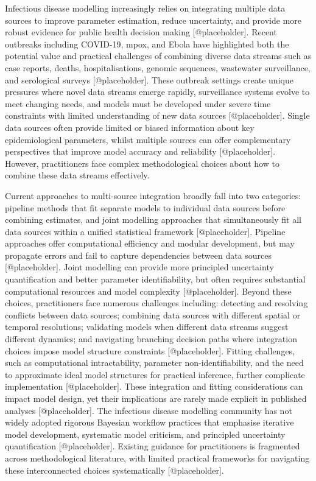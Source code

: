 \documentclass{article}
\begin{document}
Infectious disease modelling increasingly relies on integrating multiple data sources to improve parameter estimation, reduce uncertainty, and provide more robust evidence for public health decision making [@placeholder].
Recent outbreaks including COVID-19, mpox, and Ebola have highlighted both the potential value and practical challenges of combining diverse data streams such as case reports, deaths, hospitalisations, genomic sequences, wastewater surveillance, and serological surveys [@placeholder].
These outbreak settings create unique pressures where novel data streams emerge rapidly, surveillance systems evolve to meet changing needs, and models must be developed under severe time constraints with limited understanding of new data sources [@placeholder].
Single data sources often provide limited or biased information about key epidemiological parameters, whilst multiple sources can offer complementary perspectives that improve model accuracy and reliability [@placeholder].
However, practitioners face complex methodological choices about how to combine these data streams effectively.

Current approaches to multi-source integration broadly fall into two categories: pipeline methods that fit separate models to individual data sources before combining estimates, and joint modelling approaches that simultaneously fit all data sources within a unified statistical framework [@placeholder].
Pipeline approaches offer computational efficiency and modular development, but may propagate errors and fail to capture dependencies between data sources [@placeholder].
Joint modelling can provide more principled uncertainty quantification and better parameter identifiability, but often requires substantial computational resources and model complexity [@placeholder].
Beyond these choices, practitioners face numerous challenges including: detecting and resolving conflicts between data sources; combining data sources with different spatial or temporal resolutions; validating models when different data streams suggest different dynamics; and navigating branching decision paths where integration choices impose model structure constraints [@placeholder].
Fitting challenges, such as computational intractability, parameter non-identifiability, and the need to approximate ideal model structures for practical inference, further complicate implementation [@placeholder].
These integration and fitting considerations can impact model design, yet their implications are rarely made explicit in published analyses [@placeholder].
The infectious disease modelling community has not widely adopted rigorous Bayesian workflow practices that emphasise iterative model development, systematic model criticism, and principled uncertainty quantification [@placeholder].
Existing guidance for practitioners is fragmented across methodological literature, with limited practical frameworks for navigating these interconnected choices systematically [@placeholder].
\end{document}
